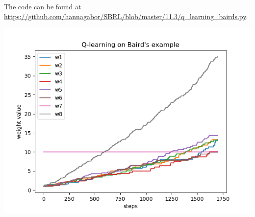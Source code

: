 \documentclass[12pt,a4paper]{article}
\begin{document}
\begin{enumerate}
  The code can be found at \url{https://github.com/hannagabor/SBRL/blob/master/11.3/q_learning_bairds.py}.

  \begin{center}
    \includegraphics[scale=0.7]{q_learning_bairds}
  \end{center}

\end{enumerate}
\end{document}
